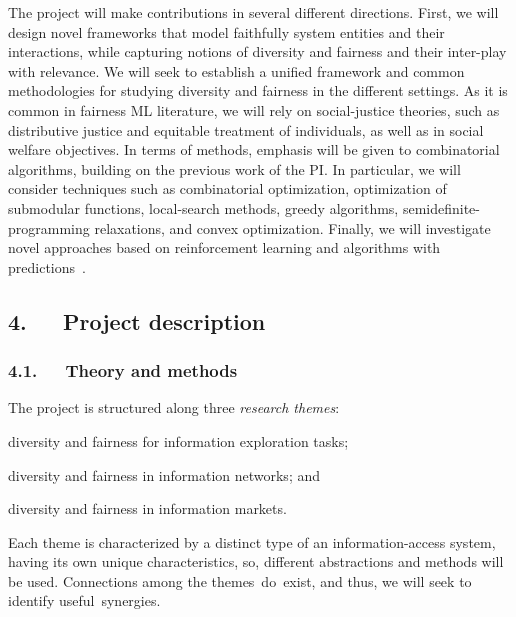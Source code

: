 \documentclass[a4paper,11pt]{article}
\begin{document}
The project will make contributions in several different directions.
First, we will design novel frameworks that model faithfully system entities and their interactions, 
while capturing notions of diversity and fairness and their inter-play with relevance.
We will seek to establish a unified framework and common methodologies for 
studying diversity and fairness in the different settings. 
As it is common in fairness ML literature, we will rely on social-justice theories, 
such as distributive justice and equitable treatment of individuals, 
as well as in social welfare objectives. 
In terms of methods, emphasis will be given to combinatorial algorithms, 
building on the previous work of the PI. 
In particular, we will consider techniques 
such as combinatorial optimization, 
optimization of submodular functions, 
local-search methods, 
greedy algorithms, 
semidefinite-programming relaxations, and convex optimization. 
Finally, we will investigate novel 
approaches based on {reinforcement learning} and {algorithms with predictions}~\cite{mitzenmacher2022algorithms}.


\vspace{-1mm}
\subsection*{4.~~~Project description}

\vspace{-1mm}
\subsubsection*{4.1.~~~Theory and methods}
\vspace{-1mm}

The project is structured along three {\em research themes}:
\vspace{-1mm}
\begin{description}
\setlength{\itemsep}{-4pt}
\item[{\exploration}\,:] 
diversity and fairness for information exploration tasks;
\item[{\networks}\,:]
diversity and fairness in information networks; and 
\item[{\markets}\,:]
diversity and fairness in information markets.
\end{description}
\vspace{-1mm}
Each theme is characterized by a distinct type of an information-access system, 
having its own unique characteristics, 
so, different abstractions and methods will be used. 
Connections among the themes~do~exist, 
and thus, we will seek to identify useful~synergies. 
\end{document}
